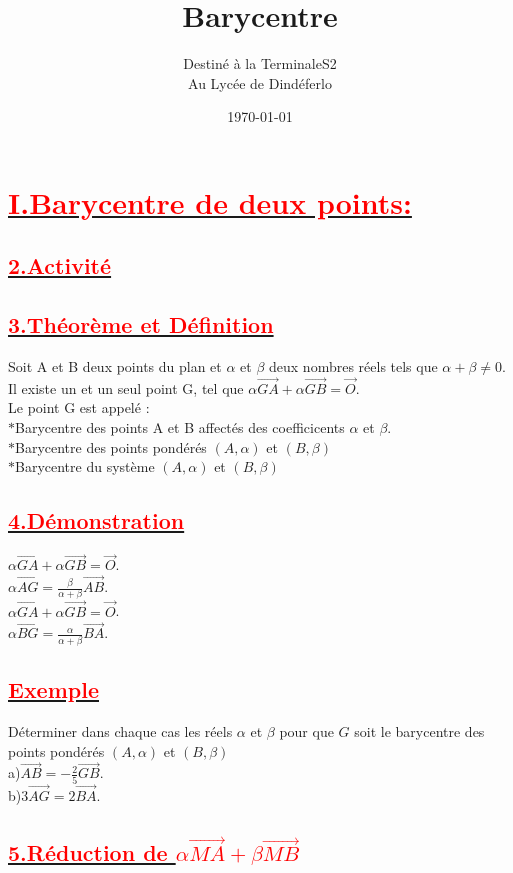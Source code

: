 \documentclass[12pt]{article}
\author{Destiné à la TerminaleS2\\Au Lycée de Dindéferlo}
\title{\textbf{Barycentre}}
\date{\today}
\begin{document}
\maketitle
\newpage

\section*{\underline{\textbf{\textcolor{red}{I.Barycentre de deux points:}}}}
\subsection*{\underline{\textbf{\textcolor{red}{2.Activité}}}}
\subsection*{\underline{\textbf{\textcolor{red}{3.Théorème et Définition}}}}
Soit A et B deux points du plan et $\alpha$ et $\beta$ deux nombres réels tels que $\alpha+\beta\neq0$. Il existe un et un seul point G, tel que $\alpha\vec{GA}+\alpha\vec{GB}=\vec{O}$.\\
Le point G est appelé :\\
$*$Barycentre des points A et B affectés des coefficicents $\alpha$ et $\beta$.\\
$*$Barycentre des points pondérés $(A,\alpha)$ et $(B,\beta)$\\
$*$Barycentre du système $(A,\alpha)$ et $(B,\beta)$
\subsection*{\underline{\textbf{\textcolor{red}{4.Démonstration}}}}
$\alpha\vec{GA}+\alpha\vec{GB}=\vec{O}$.\\
$\alpha\vec{AG}=\frac{\beta}{\alpha+\beta}\vec{AB}$.\\
$\alpha\vec{GA}+\alpha\vec{GB}=\vec{O}$.\\
$\alpha\vec{BG}=\frac{\alpha}{\alpha+\beta}\vec{BA}$.
\subsection*{\underline{\textbf{\textcolor{red}{Exemple}}}}
Déterminer dans chaque cas les réels $\alpha$ et $\beta$ pour que $G$ soit le barycentre des points pondérés $(A,\alpha)$ et $(B,\beta)$\\
a)$\vec{AB}=-\frac{2}{5}\vec{GB}$.\\
b)$3\vec{AG}=2\vec{BA}$.\\
\subsection*{\underline{\textbf{\textcolor{red}{5.Réduction de $\alpha\vec{MA}+\beta\vec{MB}$}}}}
\end{document}
